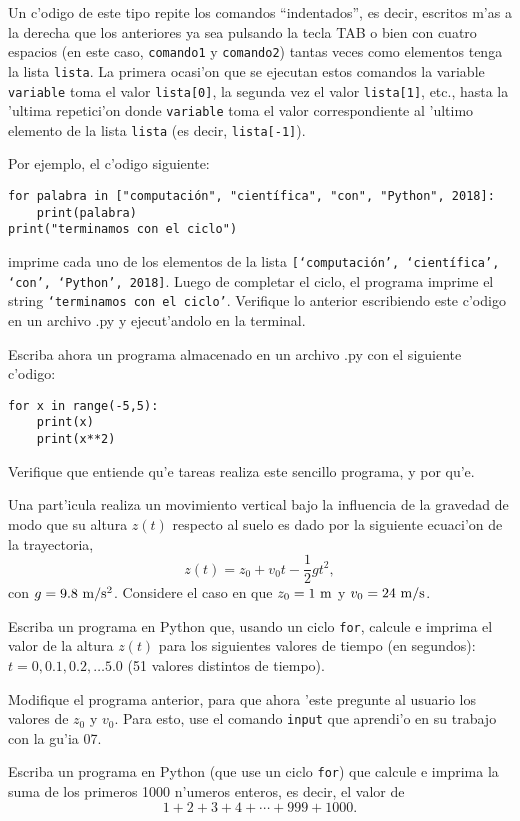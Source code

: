\documentclass[11pt]{exam}
\begin{document}
\begin{questions}
Un c'odigo de este tipo repite los comandos ``indentados'', es decir, escritos m'as a la derecha que los anteriores ya sea pulsando la tecla TAB o bien con cuatro espacios (en este caso, \texttt{comando1} y \texttt{comando2}) tantas veces como elementos tenga la lista \texttt{lista}. La primera ocasi'on que se ejecutan estos comandos la variable \texttt{variable} toma el valor \texttt{lista[0]}, la segunda vez el valor \texttt{lista[1]}, etc., hasta la 'ultima repetici'on donde \texttt{variable} toma el valor correspondiente al 'ultimo elemento de la lista \texttt{lista} (es decir, \texttt{lista[-1]}). 

Por ejemplo, el c'odigo siguiente:

\begin{verbatim}
for palabra in ["computación", "científica", "con", "Python", 2018]:
    print(palabra)
print("terminamos con el ciclo")
\end{verbatim}

imprime cada uno de los elementos de la lista \texttt{[`computación', `científica', `con', `Python', 2018]}. Luego de completar el ciclo, el programa imprime el string \texttt{`terminamos con el ciclo'}. Verifique lo anterior escribiendo este c'odigo en un archivo .py y ejecut'andolo en la terminal.

\item Escriba ahora un programa almacenado en un archivo .py con el siguiente c'odigo:

\begin{verbatim}
for x in range(-5,5):
    print(x)
    print(x**2)
\end{verbatim}

Verifique que entiende qu'e tareas realiza este sencillo programa, y por qu'e.

\item Una part'icula realiza un movimiento vertical bajo la influencia de la gravedad de modo que su altura $z(t)$ respecto al suelo es dado por la siguiente ecuaci'on de la trayectoria,
\begin{equation}
z(t)=z_0 + v_0 t -\frac{1}{2}gt^2,
\end{equation}
con $g=9.8 {\ \rm m/s^2}$. Considere el caso en que $z_0=1 {\ \rm m}$ y $v_0=24 {\ \rm m/s}$.

Escriba un programa en Python que, usando un ciclo \texttt{for}, calcule e imprima el valor de la altura $z(t)$ para los siguientes valores de tiempo (en segundos): $t=0, 0.1, 0.2, \dots 5.0$ (51 valores distintos de tiempo).

\item Modifique el programa anterior, para que ahora 'este pregunte al usuario los valores de $z_0$ y $v_0$. Para esto, use el comando \texttt{input} que aprendi'o en su trabajo con la gu'ia 07.

\item Escriba un programa en Python (que use un ciclo \texttt{for}) que calcule e imprima la suma de los primeros 1000 n'umeros enteros, es decir, el valor de 
\begin{equation}
1 + 2 + 3 + 4  + \cdots + 999 + 1000.
\end{equation}

\end{questions}
\end{document}
